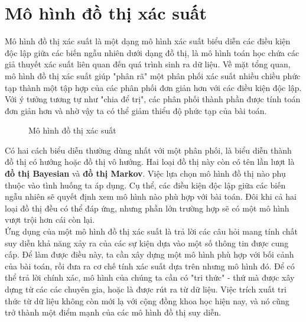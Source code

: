 \documentclass{my_style}
\begin{document}
\section{Mô hình đồ thị xác suất}
Mô hình đồ thị xác suất\cite{27}\cite{28} là một dạng mô hình xác suất biểu diễn các điều kiện độc lập giữa các biến ngẫu nhiên dưới dạng đồ thị, là mô hình toán học chứa các giả thuyết xác suất liên quan đến quá trình sinh ra dữ liệu.  Về mặt tổng quan, mô hình đồ thị xác suất giúp "phân rã" một phân phối xác suất nhiều chiều phức tạp thành một tập hợp của các phân phối đơn giản hơn với các điều kiện độc lập. Với ý tưởng tương tự như "chia để trị", các phân phối thành phần được tính toán đơn giản hơn và nhờ vậy ta có thể giảm thiểu độ phức tạp của bài toán.\\
\begin{figure}[h!]
    \centering
    \qquad
    \caption{Mô hình đồ thị xác suất}%
    \label{fig:example}%
\end{figure}
Có hai cách biểu diễn thường dùng nhất với một phân phối, là biểu diễn thành đồ thị có hướng hoặc đồ thị vô hướng. Hai loại đồ thị này còn có tên lần lượt là \textbf{đồ thị Bayesian} và \textbf{đồ thị Markov}. Việc lựa chọn mô hình đồ thị nào phụ thuộc vào tình huống ta áp dụng. Cụ thể, các điều kiện độc lập giữa các biến ngẫu nhiên sẽ quyết định xem mô hình nào phù hợp với bài toán. Đôi khi cả hai loại đồ thị đều có thể đáp ứng, nhưng phần lớn trường hợp sẽ có một mô hình vượt trội hơn cái còn lại. \\
Ứng dụng của một mô hình đồ thị xác suất là trả lời các câu hỏi mang tính chất suy diễn khả năng xảy ra của các sự kiện dựa vào một số thông tin được cung cấp. Để làm được điều này, ta cần xây dựng một mô hình phù hợp với bối cảnh của bài toán, rồi đưa ra cơ chế tính xác suất dựa trên nhưng mô hình đó. Để có thể trả lời chính xác, mô hình của chúng ta cần có "tri thức" - thứ mà được xây dựng từ các các chuyên gia, hoặc là được rút ra từ dữ liệu. Việc trích xuất tri thức từ dữ liệu không còn mới lạ với cộng đồng khoa học hiện nay, và nó cũng trở thành một điểm mạnh của các mô hình đồ thị suy diễn. \\
\end{document}
